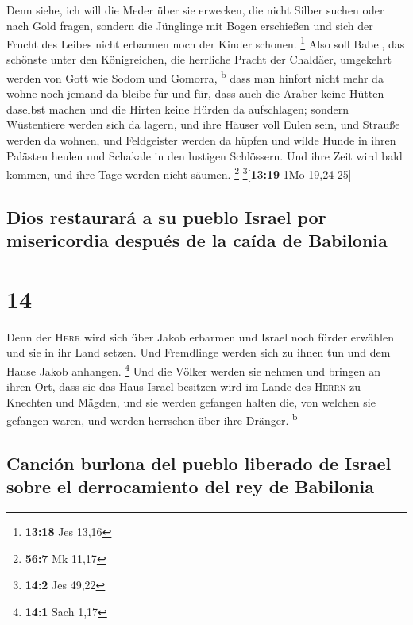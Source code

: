  Denn siehe, ich will die Meder über sie erwecken, die
nicht Silber suchen oder nach Gold fragen,  sondern die
Jünglinge mit Bogen erschießen und sich der Frucht des Leibes nicht
erbarmen noch der Kinder schonen. \footnote{\textbf{13:18} Jes 13,16}
 Also soll Babel, das schönste unter den Königreichen,
die herrliche Pracht der Chaldäer, umgekehrt werden von Gott wie Sodom
und Gomorra, \textsuperscript{b}  dass man hinfort nicht
mehr da wohne noch jemand da bleibe für und für, dass auch die Araber
keine Hütten daselbst machen und die Hirten keine Hürden da aufschlagen;
 sondern Wüstentiere werden sich da lagern, und ihre
Häuser voll Eulen sein, und Strauße werden da wohnen, und Feldgeister
werden da hüpfen  und wilde Hunde in ihren Palästen
heulen und Schakale in den lustigen Schlössern. Und ihre Zeit wird bald
kommen, und ihre Tage werden nicht säumen. \footnote{\textbf{56:7} Mk
  11,17} \footnote{\textbf{14:2} Jes 49,22}{[}\textbf{13:19} 1Mo
19,24-25{]}

\hypertarget{dios-restauraruxe1-a-su-pueblo-israel-por-misericordia-despuuxe9s-de-la-cauxedda-de-babilonia}{%
\subsection{Dios restaurará a su pueblo Israel por misericordia después
de la caída de
Babilonia}\label{dios-restauraruxe1-a-su-pueblo-israel-por-misericordia-despuuxe9s-de-la-cauxedda-de-babilonia}}

\hypertarget{section-13}{%
\section{14}\label{section-13}}

 Denn der \textsc{Herr} wird sich über Jakob erbarmen und
Israel noch fürder erwählen und sie in ihr Land setzen. Und Fremdlinge
werden sich zu ihnen tun und dem Hause Jakob anhangen. \footnote{\textbf{14:1}
  Sach 1,17}  Und die Völker werden sie nehmen und bringen
an ihren Ort, dass sie das Haus Israel besitzen wird im Lande des
\textsc{Herrn} zu Knechten und Mägden, und sie werden gefangen halten
die, von welchen sie gefangen waren, und werden herrschen über ihre
Dränger. \textsuperscript{b}

\hypertarget{canciuxf3n-burlona-del-pueblo-liberado-de-israel-sobre-el-derrocamiento-del-rey-de-babilonia}{%
\subsection{Canción burlona del pueblo liberado de Israel sobre el
derrocamiento del rey de
Babilonia}\label{canciuxf3n-burlona-del-pueblo-liberado-de-israel-sobre-el-derrocamiento-del-rey-de-babilonia}}

